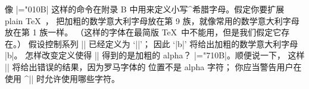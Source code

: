 \ddangerexercise \1像 |\mathchardef\alpha="010B| 这样的命令在附录 B
中用来定义小写^{希腊字母}。假定你要扩展 plain \TeX\ ，
把加粗的数学意大利字母放在第 9 族，就像常用的数学意大利字母放在第 1 族一样。%
（这样的字体在最简版 \TeX\ 中不能用，但是我们假定它存在。）%
假设控制系列 |\bmit| 已经定义为 `||'；
因此 `|{\bmit b}|' 将给出加粗的数学意大利字母 |b|。
怎样改变定义使得 |{\bmit\alpha}| 得到的是加粗的 alpha？
\checkequals\bmiexno\exno
\answer |\mathchardef\alpha="710B|。顺便说一下，
这样 |{\rm\alpha}| 将给出错误的结果，因为罗马字体的  位置不是 alpha 字符；
你应当警告用户在使用 ^|\rm| 时允许使用哪些字符。

